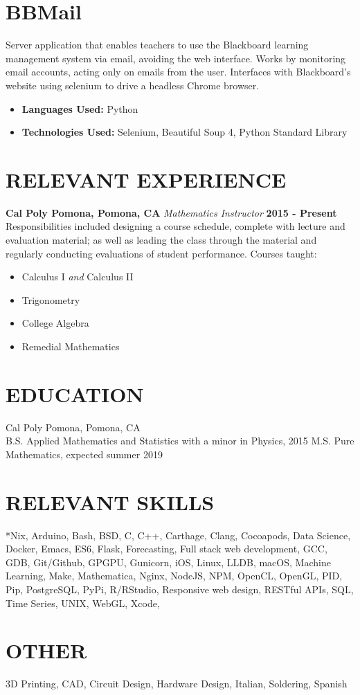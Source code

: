 \documentclass[margin]{../res}
\begin{document}
\begin{resume}
\normalsize{\section{BBMail}} Server application that enables teachers to use
the Blackboard learning management system via email, avoiding the web interface.
Works by monitoring email accounts, acting only on emails from the user.
Interfaces with Blackboard's website using selenium to drive a headless Chrome
browser.
\begin{itemize}
\item {\bf Languages Used: } Python
\item {\bf Technologies Used: } Selenium, Beautiful Soup 4, Python
  Standard Library
\end{itemize}

\section{RELEVANT EXPERIENCE}
{\bf Cal Poly Pomona, Pomona, CA}\newline
{\it Mathematics Instructor}\newline
{\bf 2015 - Present}\newline
Responsibilities included designing a course schedule, complete with lecture and
evaluation material; as well as leading the class through the material and
regularly conducting evaluations of student performance.\newline
Courses taught:
\begin{multicols}{2}
\begin{itemize}
\item Calculus I {\it and} Calculus II
\item Trigonometry
  \columnbreak
\item College Algebra
\item Remedial Mathematics
\end{itemize}
\end{multicols}

\section{EDUCATION}
Cal Poly Pomona, Pomona, CA \\
B.S. Applied Mathematics and Statistics with a minor in Physics, 2015 \newline
M.S. Pure Mathematics, expected summer 2019

  \section{RELEVANT SKILLS}
*Nix, Arduino, Bash, BSD, C, C++, Carthage, Clang, Cocoapods, Data Science, Docker, Emacs,
ES6, Flask, Forecasting,
Full stack web development, GCC, GDB, Git/Github, GPGPU, Gunicorn, iOS, Linux, LLDB,
macOS, Machine
Learning, Make, Mathematica, Nginx, NodeJS, NPM, OpenCL, OpenGL, PID, Pip, PostgreSQL,
PyPi, R/RStudio, Responsive web design, RESTful APIs, SQL, Time Series, UNIX, WebGL, Xcode,

  \section{OTHER}
  3D Printing, CAD, Circuit Design,
  Hardware Design, Italian, Soldering, Spanish
 
\end{resume}
\end{document}
